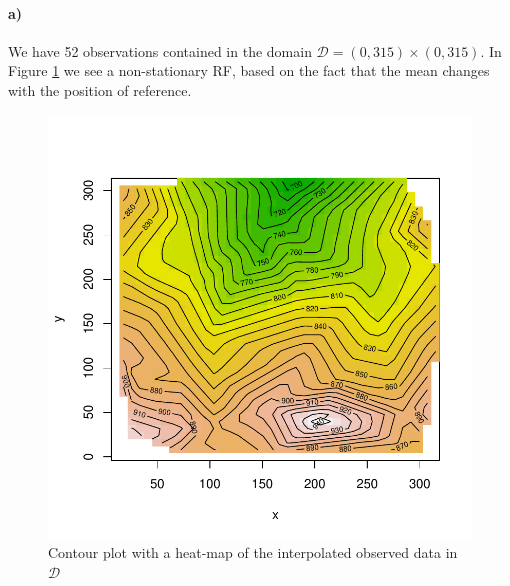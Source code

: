 \paragraph{a)}
We have 52 observations contained in the domain $\mathcal{D} = (0,315)\times(0,315)$. In Figure \ref{fig:terrain2a} we see a non-stationary RF, based on the fact that the mean changes with the position of reference. 

\begin{figure}[htb]
    \centering
    \includegraphics{figures/terrain2a.pdf}
    \caption{Contour plot with a heat-map of the interpolated observed data in $\mathcal{D}$}
    \label{fig:terrain2a}
\end{figure}


